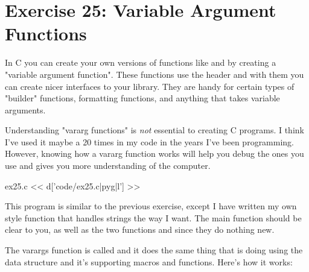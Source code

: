 \chapter{Exercise 25: Variable Argument Functions}

In C you can create your own versions of functions like  and
 by creating a "variable argument function".  These functions use
the header  and with them you can create nicer interfaces to
your library.  They are handy for certain types of "builder" functions,
formatting functions, and anything that takes variable arguments.

Understanding "vararg functions" is \emph{not} essential to creating C programs.
I think I've used it maybe a 20 times in my code in the years I've been
programming.  However, knowing how a vararg function works will help you
debug the ones you use and gives you more understanding of the computer.

\begin{code}{ex25.c}
<< d['code/ex25.c|pyg|l'] >>
\end{code}

This program is similar to the previous exercise, except I have written
my own  style function that handles strings the way I want.
The main function should be clear to you, as well as the two functions
 and  since they do nothing new.

The varargs function is called  and it does the same
thing that  is doing using the  data
structure and it's supporting macros and functions.  Here's how it works:

